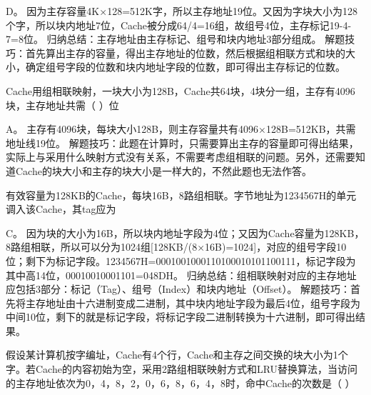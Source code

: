 \par{}
\begin{solution}D。
因为主存容量4K×128=512K字，所以主存地址19位。又因为字块大小为128个字，所以块内地址7位，Cache被分成64/4=16组，故组号4位，主存标记19-4-7=8位。
归纳总结：主存地址由主存标记、组号和块内地址3部分组成。
解题技巧：首先算出主存的容量，得出主存地址的位数，然后根据组相联方式和块的大小，确定组号字段的位数和块内地址字段的位数，即可得出主存标记的位数。
\end{solution}
\question Cache用组相联映射，一块大小为128B，Cache共64块，4块分一组，主存有4096块，主存地址共需（
）位
\par{}
\begin{solution}A。
主存有4096块，每块大小128B，则主存容量共有4096×128B=512KB，共需地址线19位。
解题技巧：此题在计算时，只需要算出主存的容量即可得出结果，实际上与采用什么映射方式没有关系，不需要考虑组相联的问题。另外，还需要知道Cache的块大小和主存的块大小是一样大的，不然此题也无法作答。
\end{solution}
\question 有效容量为128KB的Cache，每块16B，8路组相联。字节地址为1234567H的单元调入该Cache，其tag应为
\par{}
\begin{solution}C。
因为块的大小为16B，所以块内地址字段为4位；又因为Cache容量为128KB，8路组相联，所以可以分为1024组{[}128KB/(8×16B)=1024{]}，对应的组号字段10位；剩下为标记字段。1234567H=0001001000110100010101100111，标记字段为其中高14位，00010010001101=048DH。
归纳总结：组相联映射对应的主存地址应包括3部分：标记（Tag）、组号（Index）和块内地址（Offset）。
解题技巧：首先将主存地址由十六进制变成二进制，其中块内地址字段为最后4位，组号字段为中间10位，剩下的就是标记字段，将标记字段二进制转换为十六进制，即可得出结果。
\end{solution}
\question 假设某计算机按字编址，Cache有4个行，Cache和主存之间交换的块大小为1个字。若Cache的内容初始为空，采用2路组相联映射方式和LRU替换算法，当访问的主存地址依次为0，4，8，2，0，6，8，6，4，8时，命中Cache的次数是（
）
\par{}
